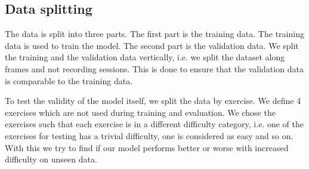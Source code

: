 \subsection{Data splitting}

The data is split into three parts. The first part is the training data. The training data is used to train the model. The second part is the validation data. We split the training and the validation data vertically, i.e. we split the dataset along frames and not recording sessions. This is done to ensure that the validation data is comparable to the training data. 

To test the validity of the model itself, we split the data by exercise. We define 4 exercises which are not used during training and evaluation. We chose the exercises such that each exercise is in a different difficulty category, i.e. one of the exercises for testing has a trivial difficulty, one is considered as easy and so on. With this we try to find if our model performs better or worse with increased difficulty on unseen data.